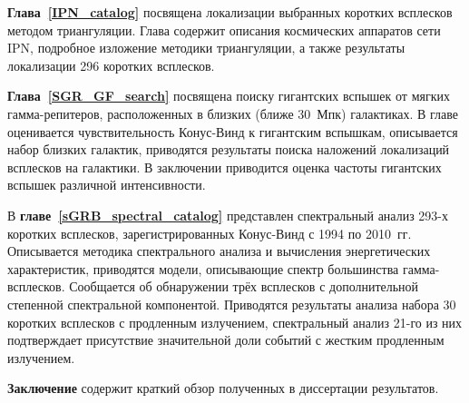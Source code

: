 \textbf{Глава~\ref{IPN_catalog}} посвящена локализации выбранных коротких всплесков 
методом триангуляции. Глава содержит описания космических аппаратов сети IPN, 
подробное изложение методики триангуляции, а также результаты локализации 
296 коротких всплесков.  

\textbf{Глава~\ref{SGR_GF_search}} посвящена поиску гигантских вспышек от мягких
гамма-репитеров, расположенных в близких (ближе 30~Мпк) галактиках.
В главе оценивается чувствительность Конус-Винд к гигантским вспышкам, 
описывается набор близких галактик, приводятся результаты поиска наложений локализаций
всплесков на галактики. В заключении приводится оценка частоты гигантских вспышек различной 
интенсивности.

В \textbf{главе~\ref{sGRB_spectral_catalog}} представлен спектральный анализ 293-х
коротких всплесков, зарегистрированных Конус-Винд с 1994 по 2010~гг. 
Описывается методика спектрального анализа и вычисления энергетических характеристик,
приводятся модели, описывающие спектр большинства гамма-всплесков.
Сообщается об обнаружении трёх всплесков с дополнительной степенной спектральной
компонентой. Приводятся результаты анализа набора 30 коротких всплесков с продленным излучением, 
спектральный анализ 21-го из них подтверждает присутствие значительной доли 
событий с жестким продленным излучением.   

\textbf{Заключение} содержит краткий обзор полученных в диссертации результатов.

\clearpage